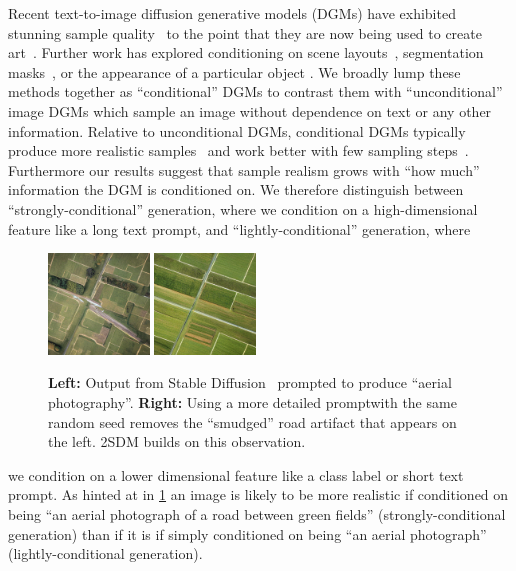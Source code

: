 \label{sec:intro}
Recent text-to-image diffusion generative models (DGMs) have exhibited stunning sample quality~\citep{saharia2022photorealistic} to the point that they are now being used to create art~\citep{oppenlaender2022creativity}. 
%
Further work has explored conditioning on scene layouts~\citep{zhang2023adding}, segmentation masks~\citep{zhang2023adding,hu2022self}, or the appearance of a particular object \citep{ma2023unified}. We broadly lump these methods together as ``conditional'' DGMs to contrast them with ``unconditional'' image DGMs which sample an image without dependence on text or any other information.
%
Relative to unconditional DGMs, conditional DGMs typically produce more realistic samples~\citep{ho2022classifier,bao2022conditional,hu2022self} and work better with few sampling steps~\citep{meng2022distillation}. Furthermore our results suggest that sample realism grows with ``how much'' information the DGM is conditioned on. We therefore distinguish between ``strongly-conditional'' generation, where we condition on a high-dimensional feature like a long text prompt, and ``lightly-conditional'' generation, where
\begin{figure}
    \centering
    \includegraphics[width=0.24\textwidth]{figs/2sdm/uncond-aerial-photo.jpg}
    \includegraphics[width=0.24\textwidth]{figs/2sdm/cond-aerial-photo.jpg}
    \caption{\textbf{Left:} Output from Stable Diffusion~\citep{rombach2022high} prompted to produce ``aerial photography''. \textbf{Right:} Using a more detailed prompt\protect\footnotemark with the same random seed removes the ``smudged'' road artifact that appears on the left. 2SDM builds on this observation.}
    \label{fig:stable-diffusion-example}
\end{figure}
we condition on a lower dimensional feature like a class label or short text prompt. As hinted at in \cref{fig:stable-diffusion-example} an image is likely to be more realistic if conditioned on being ``an aerial photograph of a road between green fields'' (strongly-conditional generation) than if it is if simply conditioned on being ``an aerial photograph'' (lightly-conditional generation). 

